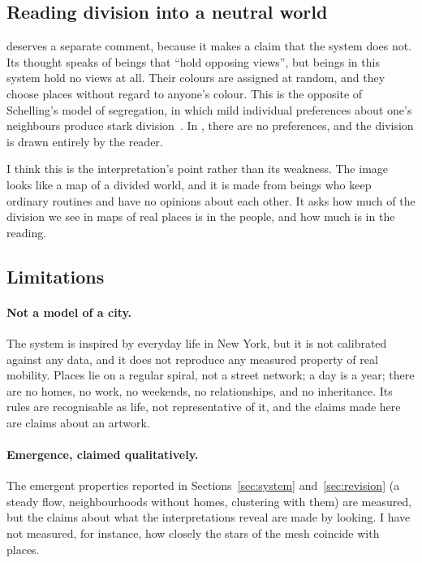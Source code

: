 \subsection{Reading division into a neutral world}

 deserves a separate comment, because it makes a claim that the system does not. Its thought speaks of beings that ``hold opposing views'', but beings in this system hold no views at all. Their colours are assigned at random, and they choose places without regard to anyone's colour. This is the opposite of Schelling's model of segregation, in which mild individual preferences about one's neighbours produce stark division~\cite{schelling1971}. In , there are no preferences, and the division is drawn entirely by the reader.

I think this is the interpretation's point rather than its weakness. The image looks like a map of a divided world, and it is made from beings who keep ordinary routines and have no opinions about each other. It asks how much of the division we see in maps of real places is in the people, and how much is in the reading.

\subsection{Limitations}

\paragraph{Not a model of a city.} The system is inspired by everyday life in New York, but it is not calibrated against any data, and it does not reproduce any measured property of real mobility. Places lie on a regular spiral, not a street network; a day is a year; there are no homes, no work, no weekends, no relationships, and no inheritance. Its rules are recognisable as life, not representative of it, and the claims made here are claims about an artwork.

\paragraph{Emergence, claimed qualitatively.} The emergent properties reported in Sections~\ref{sec:system} and~\ref{sec:revision} (a steady flow, neighbourhoods without homes, clustering with them) are measured, but the claims about what the interpretations reveal are made by looking. I have not measured, for instance, how closely the stars of the mesh coincide with places.

